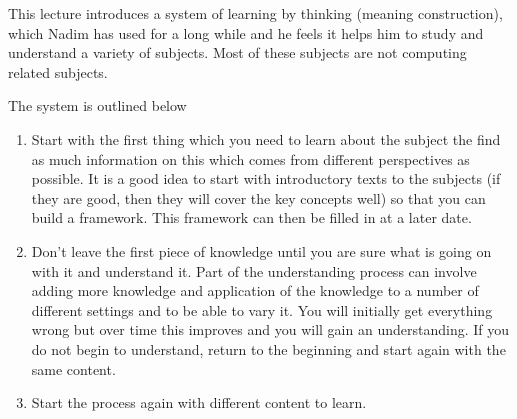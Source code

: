 
This lecture introduces a system of learning by thinking (meaning construction), which Nadim has used for a long while and he feels it helps him to study and understand a variety of subjects. Most of these subjects are not computing related subjects.

The system is outlined below
\begin{enumerate}
    \item Start with the first thing which you need to learn about the subject the find as much information on this which comes from different perspectives as possible. It is a good idea to start with introductory texts to the subjects (if they are good, then they will cover the key concepts well) so that you can build a framework. This framework can then be filled in at a later date.
    \item Don't leave the first piece of knowledge until you are sure what is going on with it and understand it. Part of the understanding process can involve adding more knowledge and application of the knowledge to a number of different settings and to be able to vary it. You will initially get everything wrong but over time this improves and you will gain an understanding. If you do not begin to understand, return to the beginning and start again with the same content.
    \item Start the process again with different content to learn.
\end{enumerate}